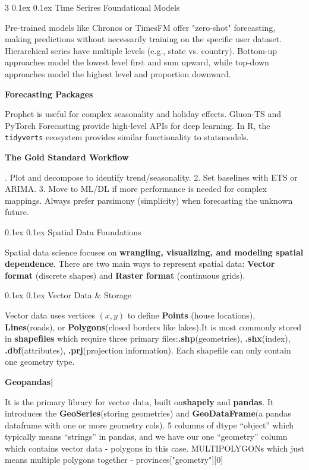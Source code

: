 \documentclass[8pt,landscape]{article}
\makeatletter
\renewcommand{\section}{\@startsection{section}{2}{0pt}%
    {0.1ex}%
    {0.1ex}%
    {\fontsize{8}{9}\bfseries\color{red}}} %
\newcommand{\code}[1]{\textcolor{myred}{\texttt{#1}}}
\newcommand{\smalltext}[1]{
  {\fontsize{8}{9}\selectfont\sloppy #1\par}
}
\makeatother
\begin{document}
\begin{multicols}{3}
\section{Time Serires Foundational Models}
\smalltext{
Pre-trained models like Chronos or TimesFM offer "zero-shot" forecasting, making predictions without necessarily training on the specific user dataset.
Hierarchical series have multiple levels (e.g., state vs. country). Bottom-up approaches model the lowest level first and sum upward, while top-down approaches model the highest level and proportion downward.
}
\textbf{Forecasting Packages}
\smalltext{
Prophet is useful for complex seasonality and holiday effects. Gluon-TS and PyTorch Forecasting provide high-level APIs for deep learning. In R, the \code{tidyverts} ecosystem provides similar functionality to statsmodels.
}
\textbf{The Gold Standard Workflow}
\smalltext{
1. Plot and decompose to identify trend/seasonality. 2. Set baselines with ETS or ARIMA. 3. Move to ML/DL if more performance is needed for complex mappings. Always prefer parsimony (simplicity) when forecasting the unknown future.
}

\section{Spatial Data Foundations}
\smalltext{
Spatial data science focuses on \textbf{wrangling, visualizing, and modeling spatial dependence}. There are two main ways to represent spatial data: \textbf{Vector format} (discrete shapes) and \textbf{Raster format} (continuous grids).
}

\section{Vector Data \& Storage}
\smalltext{
Vector data uses vertices $(x, y)$ to define \textbf{Points} (house locations), \textbf{Lines}(roads), or \textbf{Polygons}(closed borders like lakes).It is most commonly stored in \textbf{shapefiles} which require three primary files:\textbf{.shp}(geometries), \textbf{.shx}(index), \textbf{.dbf}(attributes), \textbf{.prj}(projection information). Each shapefile can only contain one geometry type.
}


\textbf{Geopandas|}
\smalltext{
It is the primary library for vector data, built on\textbf{shapely} and \textbf{pandas}. It introduces the \textbf{GeoSeries}(storing geometries) and \textbf{GeoDataFrame}(a pandas dataframe with one or more geometry cols). 5 columns of dtype “object” which typically means “strings” in pandas, and we have our one “geometry” column which contains vector data - polygons in this case. MULTIPOLYGONs which just means multiple polygons together - provinces["geometry"][0] 
}


\end{multicols}
\end{document}
